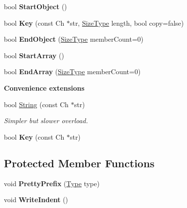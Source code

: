 \begin{Indent}
\begin{DoxyCompactItemize}
bool {\bfseries Start\+Object} ()
\item 
\mbox{\label{class_pretty_writer_a20ecbe1d31a871e4da4a3899b40ad3cd}} 
bool {\bfseries Key} (const Ch $\ast$str, \hyperlink{rapidjson_8h_a5ed6e6e67250fadbd041127e6386dcb5}{Size\+Type} length, bool copy=false)
\item 
\mbox{\label{class_pretty_writer_a6bfdfa4193193ef763cce5c592c4d20c}} 
bool {\bfseries End\+Object} (\hyperlink{rapidjson_8h_a5ed6e6e67250fadbd041127e6386dcb5}{Size\+Type} member\+Count=0)
\item 
\mbox{\label{class_pretty_writer_aec7fdf4798a3af5e31c147633f4798ed}} 
bool {\bfseries Start\+Array} ()
\item 
\mbox{\label{class_pretty_writer_a1e9d97fc950d349f55abd864c787ff37}} 
bool {\bfseries End\+Array} (\hyperlink{rapidjson_8h_a5ed6e6e67250fadbd041127e6386dcb5}{Size\+Type} member\+Count=0)
\end{DoxyCompactItemize}
\end{Indent}
\begin{Indent}\textbf{ Convenience extensions}\par
\begin{DoxyCompactItemize}
\item 
\mbox{\label{class_pretty_writer_a7e85689355a827d273f272c26b447225}} 
bool \hyperlink{class_pretty_writer_a7e85689355a827d273f272c26b447225}{String} (const Ch $\ast$str)
\begin{DoxyCompactList}\small\item\em Simpler but slower overload. \end{DoxyCompactList}\item 
\mbox{\label{class_pretty_writer_a4b2a2a6eef02c12d7a3fd77966bd4499}} 
bool {\bfseries Key} (const Ch $\ast$str)
\end{DoxyCompactItemize}
\end{Indent}
\subsection*{Protected Member Functions}
\begin{DoxyCompactItemize}
\item 
\mbox{\label{class_pretty_writer_a09709ffa3b545e007631ecfd35029843}} 
void {\bfseries Pretty\+Prefix} (\hyperlink{rapidjson_8h_a1d1cfd8ffb84e947f82999c682b666a7}{Type} type)
\item 
\mbox{\label{class_pretty_writer_a6f244ecc94fd5b134d424033b1574b7e}} 
void {\bfseries Write\+Indent} ()
\end{DoxyCompactItemize}
